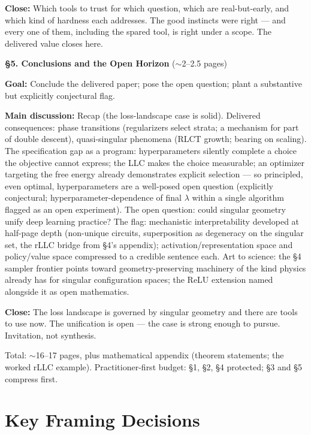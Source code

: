 \documentclass[11pt]{article}
\begin{document}
\textbf{Close:} Which tools to trust for which question, which are
real-but-early, and which kind of hardness each addresses. The good
instincts were right --- and every one of them, including the spared
tool, is right under a scope. The delivered value closes here.

\bigskip

\noindent\textbf{\S5. Conclusions and the Open Horizon} ($\sim$2--2.5
pages)

\textbf{Goal:} Conclude the delivered paper; pose the open question;
plant a substantive but explicitly conjectural flag.

\textbf{Main discussion:} Recap (the loss-landscape case is solid).
Delivered consequences: phase transitions (regularizers select strata; a
mechanism for part of double descent), quasi-singular phenomena (RLCT
growth; bearing on scaling). The specification gap as a program:
hyperparameters silently complete a choice the objective cannot express;
the LLC makes the choice measurable; an optimizer targeting the free
energy already demonstrates explicit selection --- so principled, even
optimal, hyperparameters are a well-posed open question (explicitly
conjectural; hyperparameter-dependence of final $\lambda$ within a
single algorithm flagged as an open experiment). The open question:
could singular geometry unify deep learning practice? The flag:
mechanistic interpretability developed at half-page depth (non-unique
circuits, superposition as degeneracy on the singular set, the rLLC
bridge from \S4's appendix); activation/representation space and
policy/value space compressed to a credible sentence each. Art to
science: the \S4 sampler frontier points toward geometry-preserving
machinery of the kind physics already has for singular configuration
spaces; the ReLU extension named alongside it as open mathematics.

\textbf{Close:} The loss landscape is governed by singular geometry and
there are tools to use now. The unification is open --- the case is
strong enough to pursue. Invitation, not synthesis.

\bigskip
\noindent Total: $\sim$16--17 pages, plus mathematical appendix (theorem
statements; the worked rLLC example). Practitioner-first budget: \S1,
\S2, \S4 protected; \S3 and \S5 compress first.

\section{Key Framing Decisions}
\end{document}
